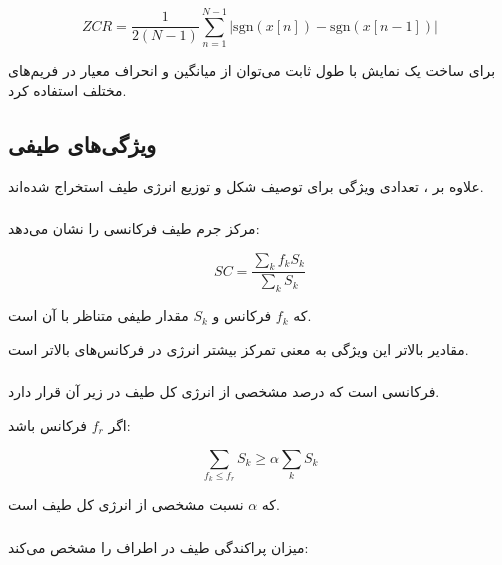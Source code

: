 \documentclass[12pt,a4paper,oneside]{report}
\begin{document}
\begin{equation}
ZCR
=
\frac{1}{2(N-1)}
\sum_{n=1}^{N-1}
\left|
\mathrm{sgn}(x[n])
-
\mathrm{sgn}(x[n-1])
\right|
\end{equation}

برای ساخت یک نمایش با طول ثابت می‌توان از میانگین و انحراف معیار
در فریم‌های مختلف استفاده کرد.


\subsection{ویژگی‌های طیفی}

علاوه بر
،
تعدادی ویژگی برای توصیف شکل و توزیع انرژی طیف استخراج شده‌اند.


\subsubsection{}

مرکز جرم طیف فرکانسی را نشان می‌دهد:

\begin{equation}
SC
=
\frac{
\sum_k f_k S_k
}{
\sum_k S_k
}
\end{equation}

که $f_k$ فرکانس و $S_k$ مقدار طیفی متناظر با آن است.

مقادیر بالاتر این ویژگی به معنی تمرکز بیشتر انرژی در فرکانس‌های بالاتر است.


\subsubsection{}

فرکانسی است که درصد مشخصی از انرژی کل طیف در زیر آن قرار دارد.

اگر $f_r$ فرکانس
باشد:

\begin{equation}
\sum_{f_k\leq f_r}S_k
\geq
\alpha
\sum_k S_k
\end{equation}

که $\alpha$ نسبت مشخصی از انرژی کل طیف است.


\subsubsection{}

میزان پراکندگی طیف در اطراف
را مشخص می‌کند:
\end{document}
